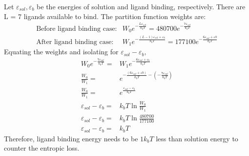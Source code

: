 \begin{enumerate}[(i)]
       Let $\varepsilon_{sol},\varepsilon_{b}$ be the energies of solution and ligand binding, respectively. There are L = 7 ligands available to bind. The partition function weights are:
   \begin{align*}
     \text{Before ligand binding case}: &W_{0}e^{-\frac{L\varepsilon_{sol}}{k_{b}T}} = 480700e^{-\frac{7\varepsilon_{sol}}{k_{b}T}}\\
     \text{After ligand binding case}: &W_{1}e^{-\frac{(L-1)\varepsilon_{sol}+\varepsilon_{b}}{k_{b}T}} = 177100e^{-\frac{6\varepsilon_{sol}+\varepsilon{b}}{k_{b}T}}
   \end{align*}
   Equating the weights and isolating for $\varepsilon_{sol}-\varepsilon_{b},$
   \begin{align*}
       W_{0}e^{-\frac{7\varepsilon_{sol}}{k_{b}T}}=&W_{1}e^{-\frac{6\varepsilon_{sol}+\varepsilon_{b}}{k_{b}T}}\\
       \frac{W_{0}}{W_{1}}=&e^{-\frac{(6\varepsilon_{sol}+\varepsilon{b})}{k_{b}T}-(-\frac{7\varepsilon_{sol}}{k_{b}T})}\\
       \frac{W_{0}}{W_{1}}=&e^{\frac{\varepsilon_{sol}-\varepsilon_{b}}{k_{b}T}}\\
       \varepsilon_{sol}-\varepsilon_{b}=&k_{b}T\ln{\frac{W_{0}}{W_{1}}}\\
       \varepsilon_{sol}-\varepsilon_{b}=&k_{b}T\ln{\frac{480700}{177100}}\\
       \varepsilon_{sol}-\varepsilon_{b}=&k_{b}T
   \end{align*}
     Therefore, ligand binding energy needs to be $1k_{b}T$ less than solution energy to counter the entropic loss.

 
\end{enumerate}
 
 